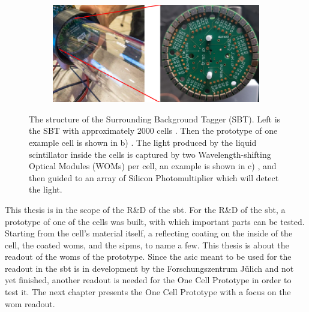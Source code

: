 \begin{figure}
\begin{subfigure}[b]{0.24\textwidth}
		\caption{}
		\label{fig:sbt_structure_cell}
	\end{subfigure}
	\begin{subfigure}[b]{0.42\textwidth}
		\centering
		\includegraphics[width=1.\textwidth]{pictures/sbt_structure_wom}
		\caption{}
		\label{fig:sbt_structure}
	\end{subfigure}
	\caption[Overview of the Surrounding Background Tagger]{The structure of the Surrounding Background Tagger (SBT). Left is the SBT with approximately 2000 cells \cite{}. Then the prototype of one example cell is shown in b) \cite{}. The light produced by the liquid scintillator inside the cells is captured by two Wavelength-shifting Optical Modules (WOMs) per cell, an example is shown in c) \cite{}, and then guided to an array of Silicon Photomultiplier which will detect the light.}
 	\label{fig:sbt}
\end{figure}

This thesis is in the scope of the R\&D of the \ac{sbt}.
For the R\&D of the \ac{sbt}, a prototype of one of the cells was built, with which important parts can be tested.
Starting from the cell's material itself, a reflecting coating on the inside of the cell, the coated \acp{wom}, and the \acp{sipm}, to name a few.
This thesis is about the readout of the \acp{wom} of the prototype.
Since the \ac{asic} meant to be used for the readout in the \ac{sbt} is in development by the Forschungszentrum Jülich and not yet finished, another readout is needed for the One Cell Prototype in order to test it.
The next chapter presents the One Cell Prototype with a focus on the \ac{wom} readout.
